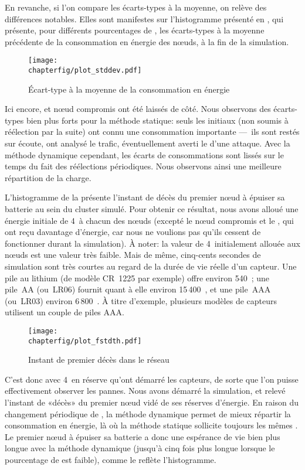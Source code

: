 En revanche, si l'on compare les écarts-types à la moyenne, on relève des différences notables.
Elles sont manifestes sur l'histogramme présenté en , qui présente, pour différents pourcentages de \cns, les écarts-types à la moyenne précédente de la consommation en énergie des nœuds, à la fin de la simulation.
\begin{figure}[!b]
    \centering
    \texttt{[image: \\chapterfig/plot\_stddev.pdf]}
    \caption{Écart-type à la moyenne de la consommation en énergie}\label{sa:fig:conso-ecart-type}
\end{figure}
Ici encore, \ch et nœud compromis ont été laissés de côté.
Nous observons des écarts-types bien plus forts pour la méthode statique: seuls les \cns initiaux (non soumis à réélection par la suite) ont connu une consommation importante ---~ils sont restés sur écoute, ont analysé le trafic, éventuellement averti le \ch d'une attaque.
Avec la méthode dynamique cependant, les écarts de consommations sont lissés sur le temps du fait des réélections périodiques.
Nous observons ainsi une meilleure répartition de la charge.

L'histogramme de la  présente l'instant de décès du premier nœud à épuiser sa batterie au sein du cluster simulé.
Pour obtenir ce résultat, nous avons alloué une énergie initiale de 4~\joule à chacun des nœuds (excepté le nœud compromis et le \ch, qui ont reçu davantage d'énergie, car nous ne voulions pas qu'ils cessent de fonctionner durant la simulation).
À noter: la valeur de 4~\joule initialement allouée aux nœuds est une valeur très faible.
Mais de même, cinq-cents secondes de simulation sont très courtes au regard de la durée de vie réelle d'un capteur.
Une pile au lithium (de modèle CR~1225 par exemple) offre environ 540~\joule; une pile~AA (ou~LR06) fournit quant à elle environ 15\,400~\joule, et une pile~AAA (ou~LR03) environ 6\,800~\joule.
À titre d'exemple, plusieurs modèles de capteurs utilisent un couple de piles AAA.
\begin{figure}[ht]
    \centering
    \texttt{[image: \\chapterfig/plot\_fstdth.pdf]}
    \caption{Instant de premier décès dans le réseau}\label{sa:fig:premier-deces}
\end{figure}
%

C'est donc avec 4~\joule en réserve qu'ont démarré les capteurs, de sorte que l'on puisse effectivement observer les pannes.
Nous avons démarré la simulation, et relevé l'instant de «décès» du premier nœud vidé de ses réserves d'énergie.
En raison du changement périodique de \cns, la méthode dynamique permet de mieux répartir la consommation en énergie, là où la méthode statique sollicite toujours les mêmes \cns.
Le premier nœud à épuiser sa batterie a donc une espérance de vie bien plus longue avec la méthode dynamique (jusqu'à cinq fois plus longue lorsque le pourcentage de \cns est faible), comme le reflète l'histogramme.

